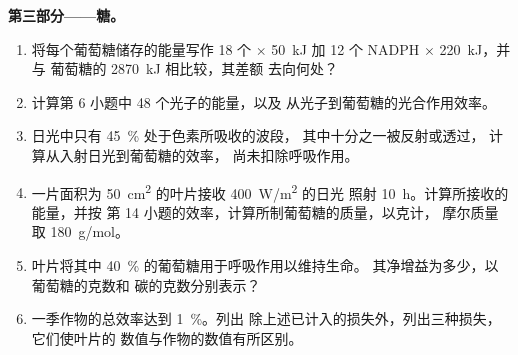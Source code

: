 \begin{problem}
\medskip
\noindent\textbf{第三部分——糖。}
\begin{enumerate}[resume]
  \item 将每个葡萄糖储存的能量写作 18 个  $\times$
        \qty{50}{kJ} 加 12 个 NADPH $\times$ \qty{220}{kJ}，并与
        葡萄糖的 \qty{2870}{kJ} 相比较，其差额
        去向何处？
  \item 计算第 6 小题中 48 个光子的能量，以及
        从光子到葡萄糖的光合作用效率。
  \item 日光中只有 \qty{45}{\%} 处于色素所吸收的波段，
        其中十分之一被反射或透过，
        计算从入射日光到葡萄糖的效率，
        尚未扣除呼吸作用。
  \item 一片面积为 \qty{50}{cm^2} 的叶片接收 \qty{400}{W/m^2} 的日光
        照射 \qty{10}{h}。计算所接收的能量，并按
        第 14 小题的效率，计算所制葡萄糖的质量，以克计，
        摩尔质量取 \qty{180}{g/mol}。
  \item 叶片将其中 \qty{40}{\%} 的葡萄糖用于呼吸作用以维持生命。
        其净增益为多少，以葡萄糖的克数和
        碳的克数分别表示？
  \item 一季作物的总效率达到 \qty{1}{\%}。列出
        除上述已计入的损失外，列出三种损失，它们使叶片的
        数值与作物的数值有所区别。
\end{enumerate}


\end{problem}
